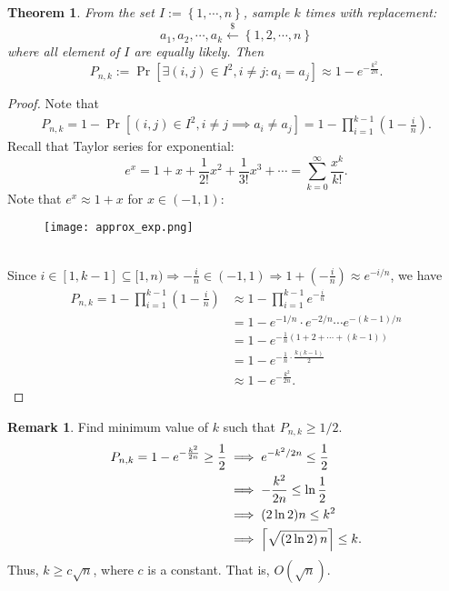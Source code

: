 \documentclass[12pt,openany]{book}
\DeclarePairedDelimiter{\ceil}{\lceil}{\rceil}
\newtheorem{theorem}{Theorem}[chapter]
\theoremstyle{definition}
\newtheorem{remark}{Remark}[chapter]
\newcommand{\set}[1]{\left\{#1\right\}}
\newcommand{\of}[1]{\left( #1 \right)}
\newcommand{\dollar}{\$}
\newcommand{\uniform}{\xleftarrow{\dollar}}
\begin{document}
	\newpage
	\begin{tcolorbox}[colback=white,colframe=thmcolor,arc=5pt,title={\color{white}\bf Birthday Bound}]
		\begin{theorem}
			From the set $I:=\set{1,\cdots,n}$, sample $k$ times with replacement: \[
			a_1,a_2,\cdots,a_k\uniform\set{1,2,\cdots,n}
			\] where all element of $I$ are equally likely. Then \[
			P_{n,k}:=\Pr\left[\exists \of{i,j}\in I^2, i\neq j:a_i=a_j\right]\approx 1-e^{-\frac{k^2}{2n}}.
			\]
		\end{theorem}
	\end{tcolorbox}
	\begin{proof}
		Note that \begin{align*}
			P_{n,k}=1-\Pr[(i,j)\in I^2, i\neq j\implies a_i\neq a_j]=1-\prod_{i=1}^{k-1}\of{1-\frac{i}{n}}.
		\end{align*} Recall that Taylor series for exponential: \[
		e^x=1+x+\frac{1}{2!}x^2+\frac{1}{3!}x^3+\cdots=\sum_{k=0}^{\infty}\frac{x^k}{k!}.
		\] Note that $e^x\approx1+x$ for $x\in(-1,1)$:
		\begin{figure}[ht!]
			\centering
			\texttt{[image: approx\_exp.png]}
		\end{figure}\\
		Since $i\in[1,k-1]\subseteq[1,n)\Rightarrow-\frac{i}{n}\in\of{-1,1}\Rightarrow 1+\of{-\frac{i}{n}}\approx e^{-i/n}$, we have \begin{align*}
			P_{n,k}=
			1-\prod_{i=1}^{k-1}\of{1-\frac{i}{n}}
			&\approx 1-\prod_{i=1}^{k-1}e^{-\frac{i}{n}}\\
			&=1-e^{-1/n}\cdot e^{-2/n}\cdots e^{-(k-1)/n}\\
			&=1-e^{-\frac{1}{n}\of{1+2+\cdots+(k-1)}}\\
			&=1-e^{-\frac{1}{n}\cdot\frac{k\of{k-1}}{2}}\\
			&\approx 1-e^{-\frac{k^2}{2n}}.
		\end{align*}
	\end{proof}

	\begin{remark}
		Find minimum value of $k$ such that $P_{n,k}\geq 1/2$. \begin{align*}
		P_{n,k}=1-e^{-\frac{k^2}{2n}}\geq\frac{1}{2}&\implies e^{-k^2/2n}\leq\frac{1}{2}\\
		&\implies-\frac{k^2}{2n}\leq\ln\frac{1}{2}\\
		&\implies (2\ln2)n\leq k^2\\
		&\implies \ceil*{\sqrt{\of{2\ln 2}n}}\leq k.
		\end{align*} 
		Thus, $k\geq c\sqrt{n}$, where $c$ is a constant. That is, $O(\sqrt{n})$.
	\end{remark}
\end{document}
